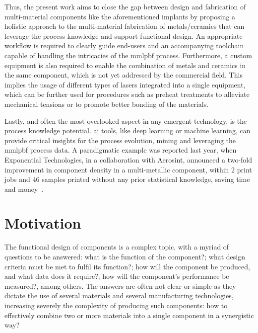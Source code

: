 Thus, the present work aims to close the gap between design and fabrication of
multi-material components like the aforementioned implants by proposing a holistic
approach to the multi-material fabrication of metals/ceramics that can leverage
the process knowledge and support functional design. An appropriate workflow is
required to clearly guide end-users and an accompanying toolchain capable of
handling the intricacies of the \gls{mmlpbf} process. Furthermore, a custom
equipment is also required to enable the combination of metals and ceramics in
the same component, which is not yet addressed by the commercial field. This
implies the usage of different types of lasers integrated into a single
equipment, which can be further used for procedures such as preheat treatments
to alleviate mechanical tensions or to promote better bonding of the materials.

Lastly, and often the most overlooked aspect in any emergent technology, is the
process knowledge potential. \gls{ai} tools, like deep learning or machine
learning, can provide critical insights for the process evolution, mining and
leveraging the \gls{mmlpbf} process data.
A paradigmatic example was reported last year, when Exponential Technologies, in
a collaboration with Aerosint, announced a two-fold improvement in component
density in a multi-metallic component, within 2 print jobs and 46 samples
printed without any prior statistical knowledge, saving time and money~\cite{xtSAAM2022AI}.




\section{Motivation}
The functional design of components is a complex topic, with a myriad of
questions to be answered: what is the function of the component?; what design
criteria must be met to fulfil its function?; how will the component be
produced, and what data does it require?; how will the component's performance
be measured?, among others. The answers are often not clear or simple as they
dictate the use of several materials and several manufacturing technologies,
increasing severely the complexity of producing such components: how to
effectively combine two or more materials into a single component in a
synergistic way?

